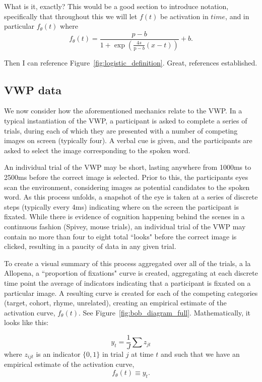 \documentclass{article}
\begin{document}
What is it, exactly? This would be a good section to introduce notation, specifically that throughout this we will let $f(t)$ be activation in $time$, and in particular $f_{\theta}(t)$ where
\begin{equation} \label{eq:logistic}
f_{\theta}(t) = \frac{p-b}{1 + \exp \left(\frac{4s}{\text{p}-b} (x - t) \right)} + b.
\end{equation}

Then I can reference Figure~\ref{fig:logistic_definition}. Great, references established.

\subsection{VWP data}


We now consider how the aforementioned mechanics relate to the VWP. In a typical instantiation of the VWP, a participant is asked to complete a series of trials, during each of which they are presented with a number of competing images on screen (typically four). A verbal cue is given, and the participants are asked to select the image corresponding to the spoken word.

An individual trial of the VWP may be short, lasting anywhere from 1000ms to 2500ms before the correct image is selected. Prior to this, the participants eyes scan the environment, considering images as potential candidates to the spoken word. As this process unfolds, a snapshot of the eye is taken at a series of discrete steps (typically every 4ms) indicating where on the screen the participant is fixated. While there is evidence of cognition happening behind the scenes in a continuous fashion (Spivey, mouse trials), an individual trial of the VWP may contain no more than four to eight total ``looks" before the correct image is clicked, resulting in a paucity of data in any given trial.

To create a visual summary of this process aggregated over all of the trials, a la Allopena, a ``proportion of fixations" curve is created, aggregating at each discrete time point the average of indicators indicating that a participant is fixated on a particular image. A resulting curve is created for each of the competing categories (target, cohort, rhyme, unrelated), creating an empirical estimate of the activation curve, $f_{\theta}(t)$. See Figure~\ref{fig:bob_diagram_full}. Mathematically, it looks like this:

\begin{equation}
y_{t} = \frac1J \sum z_{jt}
\end{equation}
where $z_{ijt}$ is an indicator $\{0, 1\}$ in trial $j$ at time $t$ and such that we have an empirical estimate of the activation curve,
\begin{equation}
f_{\theta}(t) \equiv y_t.
\end{equation}
\end{document}
